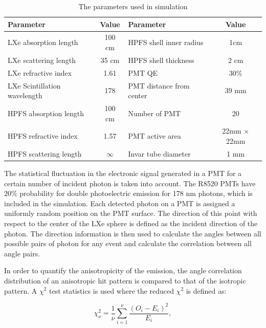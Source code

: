\begin{table}[h]
  \centering
  \caption{The parameters used in simulation}
  \label{tab:OptPar}
  \begin{tabular}{|l c||l c|}
  \hline
  Parameter & Value & Parameter & Value \\
  \hline
  LXe absorption length & 100 cm & HPFS shell inner radius & 1cm \\
  LXe scattering length & 35 cm & HPFS shell thickness & 2 cm\\
  LXe refractive index & 1.61  & PMT QE &  30\% \\
  LXe Scintillation wavelength & 178& PMT distance from center & 39 mm\\
  HPFS absorption length & 100 cm  & Number of PMT & 20 \\
  HPFS refractive index & 1.57 & PMT active area & 22mm $\times$ 22mm \\
  HPFS scattering length & $\infty$ & Invar tube diameter & 1 mm\\
  \hline
 \end{tabular}
\end{table}


The statistical fluctuation 
in the electronic signal generated in a PMT for a certain number of incident photon is 
taken into account. The R8520 PMTs have 20\% probability 
for double photoelectric emission for 178 nm photons, which is included in the simulation.
Each detected photon on a PMT is assigned a uniformly random position on the PMT surface. 
The direction of this point with respect 
to the center of the LXe sphere is defined as the incident direction of the photon. The direction information 
is then used to calculate the angles between all possible pairs of photon for any event and 
calculate the correlation between all angle pairs.  

In order to quantify the anisotropicity of the emission, 
the angle correlation distribution of an anisotropic hit pattern is compared to that of the isotropic 
pattern. A $\chi^2$ test statistics is used where the reduced $\chi^2$ is defined as: 

\begin{equation}
\chi^2_\nu = \frac{1}{\nu} \sum^{\nu}_{i=1} \frac{(O_i - E_i)^2}{E_i},
\label{redchi2}
\end{equation}

